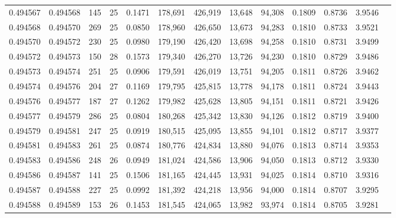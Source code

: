 \begin{tabular}{rrrrrrrrrrrrr}
0.494567 & 0.494568 & 145 &  25 &                                     0.1471 & 178,691 & 426,919 &  13,648 &  94,308 & 0.1809 & 0.8736 & 3.9546 \\
0.494568 & 0.494570 & 269 &  25 &                                     0.0850 & 178,960 & 426,650 &  13,673 &  94,283 & 0.1810 & 0.8733 & 3.9521 \\
0.494570 & 0.494572 & 230 &  25 &                                     0.0980 & 179,190 & 426,420 &  13,698 &  94,258 & 0.1810 & 0.8731 & 3.9499 \\
0.494572 & 0.494573 & 150 &  28 &                                     0.1573 & 179,340 & 426,270 &  13,726 &  94,230 & 0.1810 & 0.8729 & 3.9486 \\
0.494573 & 0.494574 & 251 &  25 &                                     0.0906 & 179,591 & 426,019 &  13,751 &  94,205 & 0.1811 & 0.8726 & 3.9462 \\
0.494574 & 0.494576 & 204 &  27 &                                     0.1169 & 179,795 & 425,815 &  13,778 &  94,178 & 0.1811 & 0.8724 & 3.9443 \\
0.494576 & 0.494577 & 187 &  27 &                                     0.1262 & 179,982 & 425,628 &  13,805 &  94,151 & 0.1811 & 0.8721 & 3.9426 \\
0.494577 & 0.494579 & 286 &  25 &                                     0.0804 & 180,268 & 425,342 &  13,830 &  94,126 & 0.1812 & 0.8719 & 3.9400 \\
0.494579 & 0.494581 & 247 &  25 &                                     0.0919 & 180,515 & 425,095 &  13,855 &  94,101 & 0.1812 & 0.8717 & 3.9377 \\
0.494581 & 0.494583 & 261 &  25 &                                     0.0874 & 180,776 & 424,834 &  13,880 &  94,076 & 0.1813 & 0.8714 & 3.9353 \\
0.494583 & 0.494586 & 248 &  26 &                                     0.0949 & 181,024 & 424,586 &  13,906 &  94,050 & 0.1813 & 0.8712 & 3.9330 \\
0.494586 & 0.494587 & 141 &  25 &                                     0.1506 & 181,165 & 424,445 &  13,931 &  94,025 & 0.1814 & 0.8710 & 3.9316 \\
0.494587 & 0.494588 & 227 &  25 &                                     0.0992 & 181,392 & 424,218 &  13,956 &  94,000 & 0.1814 & 0.8707 & 3.9295 \\
0.494588 & 0.494589 & 153 &  26 &                                     0.1453 & 181,545 & 424,065 &  13,982 &  93,974 & 0.1814 & 0.8705 & 3.9281 \\

\end{tabular}
